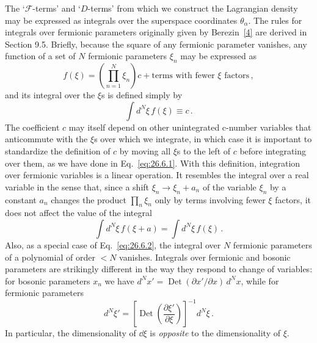 The `\(\mathcal{F}\)-terms' and `\(D\)-terms' from which we construct the
Lagrangian density may be expressed as integrals over the superspace
coordinates \(\theta_\alpha\). The rules for integrals over fermionic
parameters originally given by Berezin~\hyperref[ch26-ref-4]{[4]} are derived
in Section 9.5. Briefly, because the square of any fermionic parameter
vanishes, any function of a set of \(N\) fermionic parameters \(\xi_n\) may
be expressed as
\begin{equation}
  f(\xi)
  =\left(\prod_{n=1}^{N}\xi_n\right)c
   +\text{terms with fewer \(\xi\) factors}\,,
  \tag{26.6.1}\label{eq:26.6.1}
\end{equation}
and its integral over the \(\xi\)s is defined simply by
\begin{equation}
  \int d^N\xi\,f(\xi)\equiv c\,.
  \tag{26.6.2}\label{eq:26.6.2}
\end{equation}
The coefficient \(c\) may itself depend on other unintegrated c-number
variables that anticommute with the \(\xi\)s over which we integrate, in which
case it is important to standardize the definition of \(c\) by moving all
\(\xi\)s to the left of \(c\) before integrating over them, as we have done
in Eq.~\eqref{eq:26.6.1}. With this definition, integration over fermionic
variables is a linear operation. It resembles the integral over a real
variable in the sense that, since a shift \(\xi_n\longrightarrow\xi_n+a_n\)
of the variable \(\xi_n\) by a constant \(a_n\) changes the product
\(\prod_n\xi_n\) only by terms involving fewer \(\xi\) factors, it does not
affect the value of the integral
\begin{equation}
  \int d^N\xi\,f(\xi+a)=\int d^N\xi\,f(\xi)\,.
  \tag{26.6.3}\label{eq:26.6.3}
\end{equation}
Also, as a special case of Eq.~\eqref{eq:26.6.2}, the integral over \(N\)
fermionic parameters of a polynomial of order \(<N\) vanishes. Integrals over
fermionic and bosonic parameters are strikingly different in the way they
respond to change of variables: for bosonic parameters \(x_n\) we have
\(d^Nx'=\operatorname{Det}(\partial x'/\partial x)\,d^Nx\), while for
fermionic parameters
\begin{equation}
  d^N\xi'
  =\left[\operatorname{Det}
    \left(\frac{\partial\xi'}{\partial\xi}\right)\right]^{-1}d^N\xi\,.
  \tag{26.6.4}\label{eq:26.6.4}
\end{equation}
In particular, the dimensionality of \(\dd\xi\) is \emph{opposite} to the
dimensionality of \(\xi\).

